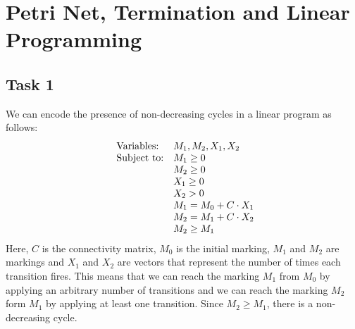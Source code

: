 \section{Petri Net, Termination and Linear Programming}
\subsection{Task 1}
We can encode the presence of non-decreasing cycles in a linear program as follows:
\begin{equation*}
\begin{array}{ll@{}ll}
\text{Variables:} 	& M_1, M_2, X_1, X_2\\
\text{Subject to:} & M_1 \geq 0\\
										& M_2 \geq 0\\
										& X_1 \geq 0\\
										& X_2 > 0\\
										& M_1 = M_0 + C \cdot X_1\\
										& M_2 = M_1 + C \cdot X_2\\
										& M_2 \geq M_1
\end{array}
\end{equation*}
Here, $C$ is the connectivity matrix, $M_0$ is the initial marking, $M_1$ and $M_2$ are markings and $X_1$ and $X_2$ are vectors that represent the number of times each transition fires.
This means that we can reach the marking $M_1$ from $M_0$ by applying an arbitrary number of transitions and we can reach the marking $M_2$ form $M_1$ by applying at least one transition. Since $M_2 \geq M_1$, there is a non-decreasing cycle.

